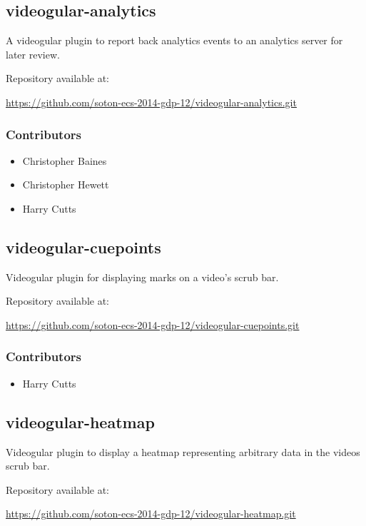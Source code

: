 \subsection{videogular-analytics}
\label{Section:Repo_videogular_analytics}

A videogular plugin to report back analytics events to an analytics server for later review.

Repository available at:

\url{https://github.com/soton-ecs-2014-gdp-12/videogular-analytics.git}

\subsubsection{Contributors}
\begin{itemize}
  \item Christopher Baines
  \item Christopher Hewett
  \item Harry Cutts
\end{itemize}

\subsection{videogular-cuepoints}
\label{Section:Repo_videogular_cuepoints}

Videogular plugin for displaying marks on a video's scrub bar.

Repository available at:

\url{https://github.com/soton-ecs-2014-gdp-12/videogular-cuepoints.git}

\subsubsection{Contributors}
\begin{itemize}
  \item Harry Cutts
\end{itemize}

\subsection{videogular-heatmap}
\label{Section:Repo_videogular_heatmap}

Videogular plugin to display a heatmap representing arbitrary data in the videos scrub bar.

Repository available at:

\url{https://github.com/soton-ecs-2014-gdp-12/videogular-heatmap.git}

